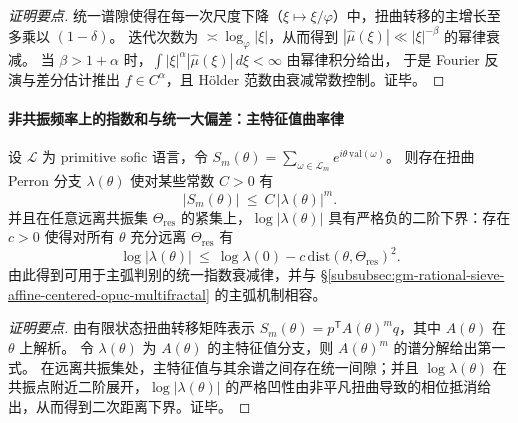 \begin{proof}[证明要点]
统一谱隙使得在每一次尺度下降（\(\xi\mapsto \xi/\varphi\)）中，扭曲转移的主增长至多乘以 \((1-\delta)\)。
迭代次数为 \(\asymp \log_\varphi|\xi|\)，从而得到
\(
|\widehat\mu(\xi)|\ll |\xi|^{-\beta}
\)
的幂律衰减。
当 \(\beta>1+\alpha\) 时，\(\int |\xi|^{\alpha}|\widehat\mu(\xi)|\,d\xi<\infty\) 由幂律积分给出，
于是 Fourier 反演与差分估计推出 \(f\in C^\alpha\)，且 Hölder 范数由衰减常数控制。证毕。
\end{proof}

\paragraph{非共振频率上的指数和与统一大偏差：主特征值曲率律}
\begin{proposition}\label{prop:gm-nonresonant-exp-sum-curvature}
设 \(\mathcal{L}\) 为 primitive sofic 语言，令
\(
S_m(\theta)=\sum_{\omega\in\mathcal{L}_m} e^{i\theta\,\mathrm{val}(\omega)}
\)。
则存在扭曲 Perron 分支 \(\lambda(\theta)\) 使对某些常数 \(C>0\) 有
\[
|S_m(\theta)|\ \le\ C\,|\lambda(\theta)|^{m}.
\]
并且在任意远离共振集 \(\Theta_{\mathrm{res}}\) 的紧集上，\(\log|\lambda(\theta)|\) 具有严格负的二阶下界：存在 \(c>0\) 使得对所有 \(\theta\) 充分远离 \(\Theta_{\mathrm{res}}\) 有
\[
\log|\lambda(\theta)|\ \le\ \log\lambda(0)-c\,\mathrm{dist}(\theta,\Theta_{\mathrm{res}})^2.
\]
由此得到可用于主弧判别的统一指数衰减律，并与 \S\ref{subsubsec:gm-rational-sieve-affine-centered-opuc-multifractal} 的主弧机制相容。
\end{proposition}

\begin{proof}[证明要点]
由有限状态扭曲转移矩阵表示 \(S_m(\theta)=p^{\mathsf T}A(\theta)^{m}q\)，其中 \(A(\theta)\) 在 \(\theta\) 上解析。
令 \(\lambda(\theta)\) 为 \(A(\theta)\) 的主特征值分支，则 \(A(\theta)^m\) 的谱分解给出第一式。
在远离共振集处，主特征值与其余谱之间存在统一间隙；并且 \(\log\lambda(\theta)\) 在共振点附近二阶展开，\(\log|\lambda(\theta)|\) 的严格凹性由非平凡扭曲导致的相位抵消给出，从而得到二次距离下界。证毕。
\end{proof}

